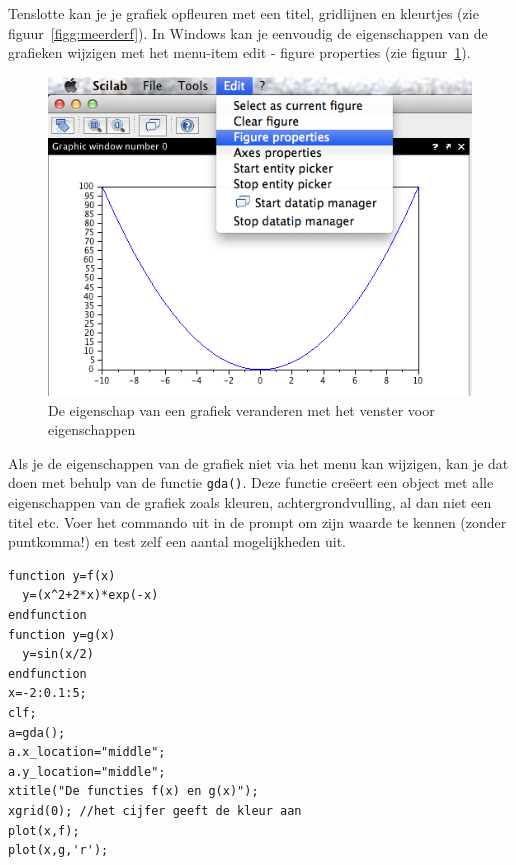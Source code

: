 Tenslotte kan je je grafiek opfleuren met een titel, gridlijnen en kleurtjes (zie figuur~\ref{figg:meerderf}). In Windows kan je eenvoudig de eigenschappen van de grafieken wijzigen met het menu-item edit - figure properties (zie figuur~\ref{fig:11bgrafiek}). 
\begin{figure}[htbp]
\centering
\includegraphics[width=\textwidth]{figuren/scilab/11bgrafiek}
\caption{De eigenschap van een grafiek veranderen met het venster voor eigenschappen}
\label{fig:11bgrafiek}
\end{figure}

Als je de eigenschappen van de grafiek niet via het menu kan wijzigen, kan je dat doen met behulp van de functie \verb+gda()+. Deze functie creëert een object met alle eigenschappen van de grafiek zoals kleuren, achtergrondvulling, al dan niet een titel etc. Voer het commando uit in de prompt om zijn waarde te kennen (zonder puntkomma!) en test zelf een aantal mogelijkheden uit.


\begin{lstlisting}[caption={Meerdere functies in \'e\'en grafiek}, label=meerderefunctiesplotten]	
function y=f(x)
  y=(x^2+2*x)*exp(-x)
endfunction
function y=g(x)
  y=sin(x/2)
endfunction
x=-2:0.1:5;
clf;
a=gda(); 
a.x_location="middle";
a.y_location="middle";
xtitle("De functies f(x) en g(x)");
xgrid(0); //het cijfer geeft de kleur aan
plot(x,f);
plot(x,g,'r');
\end{lstlisting}


